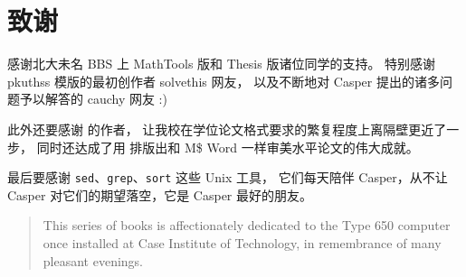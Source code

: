 %
%
%
%

\chapter{致谢}

感谢北大未名 BBS 上 MathTools 版和 Thesis 版诸位同学的支持。
特别感谢 pkuthss 模版的最初创作者 solvethis 网友，
以及不断地对 Casper 提出的诸多问题予以解答的 cauchy 网友 :)

此外还要感谢 \parencite{pku-thesisstyle} 的作者，
让我校在学位论文格式要求的繁复程度上离隔壁更近了一步，
同时还达成了用  排版出和 M\$ Word 一样审美水平论文的伟大成就。

最后要感谢 \verb|sed|、\verb|grep|、\verb|sort| 这些 Unix 工具，
它们每天陪伴 Casper，从不让 Casper 对它们的期望落空，它是 Casper 最好的朋友。

\vspace{1em}
\begin{quotation}
\small This series of books is affectionately dedicated to the
Type 650 computer once installed at Case Institute of Technology,
in remembrance of many pleasant evenings.

\end{quotation}

